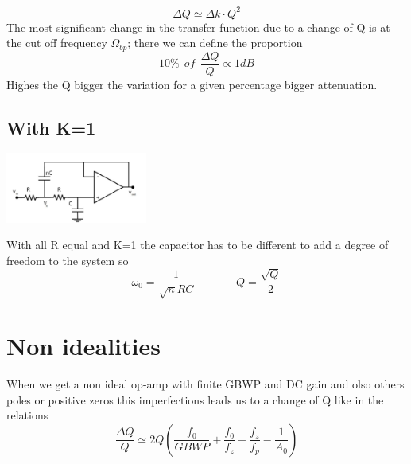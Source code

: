 \begin{equation}
\Delta Q \simeq \Delta k \cdot Q^2
\end{equation}
The most significant change in the transfer function due to a change of Q is at the cut off frequency $\Omega_{bp}$; there we can define the proportion
\begin{equation}
10\% \ \ of \ \ \frac{\Delta Q}{Q} \propto 1dB
\end{equation}
Highes the Q bigger the variation for a given percentage bigger attenuation.\\


\subsection{With K=1}
\centering
\includegraphics[width=0.35\textwidth]{skb.png}\\
\raggedright

With all R equal and K=1 the capacitor has to be different to add a degree of freedom to the system so
\begin{equation}
\omega_0=\frac{1}{\sqrt{n}RC}\ \ \ \ \ \ \ \ \ \ \ \ \ \ \ \ \ Q=\frac{\sqrt{Q}}{2}
\end{equation}

\section{Non idealities}
When we get a non ideal op-amp with finite GBWP and DC gain and olso others poles or positive zeros this imperfections leads us to a change of Q like in the relations 
\begin{equation}
\frac{\Delta Q}{Q}\simeq 2Q\left(\frac{f_0}{GBWP}+\frac{f_0}{f_z}+\frac{f_z}{f_p}-\frac{1}{A_0}\right)
\end{equation}
